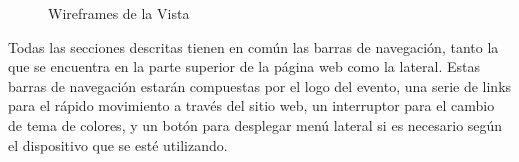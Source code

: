 \begin{figure}
{\begin{subfigure}
        \label{fig:wireframe_capt_img}
    \end{subfigure}
    }
    \hfill
\caption{Wireframes de la Vista}
\label{fig:wireframes_vista}
\end{figure}




Todas las secciones descritas tienen en común las barras de navegación, tanto la que se encuentra en la parte superior de la página web como la lateral. Estas barras de navegación estarán compuestas por el logo del evento, una serie de links para el rápido movimiento a través del sitio web, un interruptor para el cambio de tema de colores, y un botón para desplegar menú lateral si es necesario según el dispositivo que se esté utilizando.

